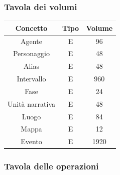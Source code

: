 \documentclass{article}
\begin{document}
\subsubsection{Tavola dei volumi}

\begin{center}\begin{tabular}{ |c|c|c| }
		\hline
		\textbf{Concetto} & \textbf{Tipo} & \textbf{Volume} \\
		\hline
		Agente            & E             & 96              \\
		\hline
		Personaggio       & E             & 48              \\
		\hline
		Alias             & E             & 48              \\
		\hline
		Intervallo        & E             & 960             \\
		\hline
		Fase              & E             & 24              \\
		\hline
		Unità narrativa   & E             & 48              \\
		\hline
		Luogo             & E             & 84              \\
		\hline
		Mappa             & E             & 12              \\
		\hline
		Evento            & E             & 1920            \\
		\hline
	\end{tabular}\end{center}

\subsubsection{Tavola delle operazioni}
\end{document}
